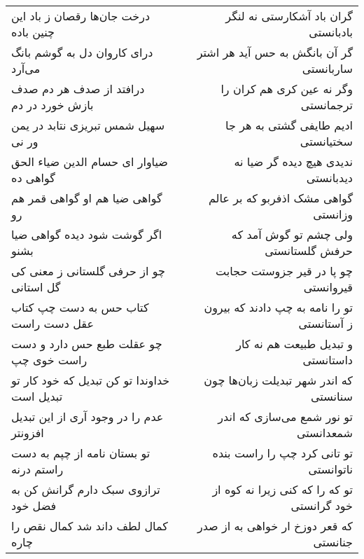 \begin{center}
\begin{longtable}{l p{0.5cm} r}
\\
درخت جان‌ها رقصان ز باد این چنین باده
&&
گران باد آشکارستی نه لنگر بادبانستی
\\
درای کاروان دل به گوشم بانگ می‌آرد
&&
گر آن بانگش به حس آید هر اشتر ساربانستی
\\
درافتد از صدف هر دم صدف بازش خورد در دم
&&
وگر نه عین کری هم کران را ترجمانستی
\\
سهیل شمس تبریزی نتابد در یمن ور نی
&&
ادیم طایفی گشتی به هر جا سختیانستی
\\
ضیاوار ای حسام الدین ضیاء الحق گواهی ده
&&
ندیدی هیچ دیده گر ضیا نه دیدبانستی
\\
گواهی ضیا هم او گواهی قمر هم رو
&&
گواهی مشک اذفربو که بر عالم وزانستی
\\
اگر گوشت شود دیده گواهی ضیا بشنو
&&
ولی چشم تو گوش آمد که حرفش گلستانستی
\\
چو از حرفی گلستانی ز معنی کی گل استانی
&&
چو پا در قیر جزوستت حجابت قیروانستی
\\
کتاب حس به دست چپ کتاب عقل دست راست
&&
تو را نامه به چپ دادند که بیرون ز آستانستی
\\
چو عقلت طبع حس دارد و دست راست خوی چپ
&&
و تبدیل طبیعت هم نه کار داستانستی
\\
خداوندا تو کن تبدیل که خود کار تو تبدیل است
&&
که اندر شهر تبدیلت زبان‌ها چون سنانستی
\\
عدم را در وجود آری از این تبدیل افزونتر
&&
تو نور شمع می‌سازی که اندر شمعدانستی
\\
تو بستان نامه از چپم به دست راستم درنه
&&
تو تانی کرد چپ را راست بنده ناتوانستی
\\
ترازوی سبک دارم گرانش کن به فضل خود
&&
تو که را که کنی زیرا نه کوه از خود گرانستی
\\
کمال لطف داند شد کمال نقص را چاره
&&
که قعر دوزخ ار خواهی به از صدر جنانستی
\\
\end{longtable}
\end{center}
